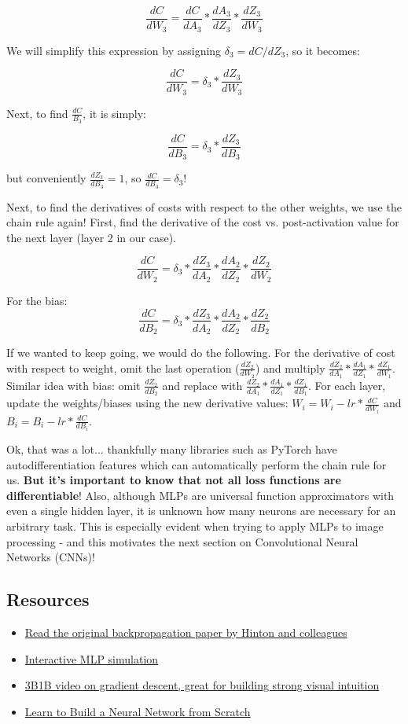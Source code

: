 \documentclass[12pt]{article}
\begin{document}
$$\frac{dC}{dW_3} = \frac{dC}{dA_3} * \frac{dA_3}{dZ_3} * \frac{dZ_3}{dW_3}$$ 

We will simplify this expression by assigning $\delta_3=dC/dZ_3$, so it becomes:

$$\frac{dC}{dW_3} = \delta_3 * \frac{dZ_3}{dW_3}$$

Next, to find $\frac{dC}{B_3}$, it is simply:

$$\frac{dC}{dB_3} = \delta_3 * \frac{dZ_3}{dB_3}$$

but conveniently $\frac{dZ_3}{dB_3} = 1$, so $\frac{dC}{dB_3} = \delta_3$!

Next, to find the derivatives of costs with respect to the other weights, we use the chain rule again! First, find the derivative of the cost vs. post-activation value for the next layer (layer 2 in our case). 

$$\frac{dC}{dW_2} = \delta_3 * \frac{dZ_3}{dA_2} * \frac{dA_2}{dZ_2} * \frac{dZ_2}{dW_2}$$

For the bias:
$$\frac{dC}{dB_2} = \delta_3 * \frac{dZ_3}{dA_2} * \frac{dA_2}{dZ_2} * \frac{dZ_2}{dB_2}$$

If we wanted to keep going, we would do the following. For the derivative of cost with respect to weight, omit the last operation ($\frac{dZ_2}{dW_2}$) and multiply $\frac{dZ_2}{dA_1} * \frac{dA_1}{dZ_1} * \frac{dZ_1}{dW_1}$. Similar idea with bias: omit $\frac{dZ_2}{dB_2}$ and replace with $\frac{dZ_2}{dA_1} * \frac{dA_1}{dZ_1} * \frac{dZ_1}{dB_1}$. For each layer, update the weights/biases using the new derivative values: $W_i = W_i - lr * \frac{dC}{dW_i}$ and $B_i = B_i - lr * \frac{dC}{dB_i}$. 

Ok, that was a lot... thankfully many libraries such as PyTorch have autodifferentiation features which can automatically perform the chain rule for us. \textbf{But it's important to know that not all loss functions are differentiable}! Also, although MLPs are universal function approximators with even a single hidden layer, it is unknown how many neurons are necessary for an arbitrary task. This is especially evident when trying to apply MLPs to image processing - and this motivates the next section on Convolutional Neural Networks (CNNs)! 


\subsection{Resources}
\begin{itemize}
  \item \href{https://www.nature.com/articles/323533a0}{Read the original backpropagation paper by Hinton and colleagues}
  \item \href{https://playground.tensorflow.org}{Interactive MLP simulation}
  \item \href{https://www.youtube.com/watch?v=IHZwWFHWa-w}{3B1B video on gradient descent, great for building strong visual intuition}
  \item \href{https://medium.com/@waadlingaadil/learn-to-build-a-neural-network-from-scratch-yes-really-cac4ca457efc}{Learn to Build a Neural Network from Scratch}
\end{itemize}
\end{document}
